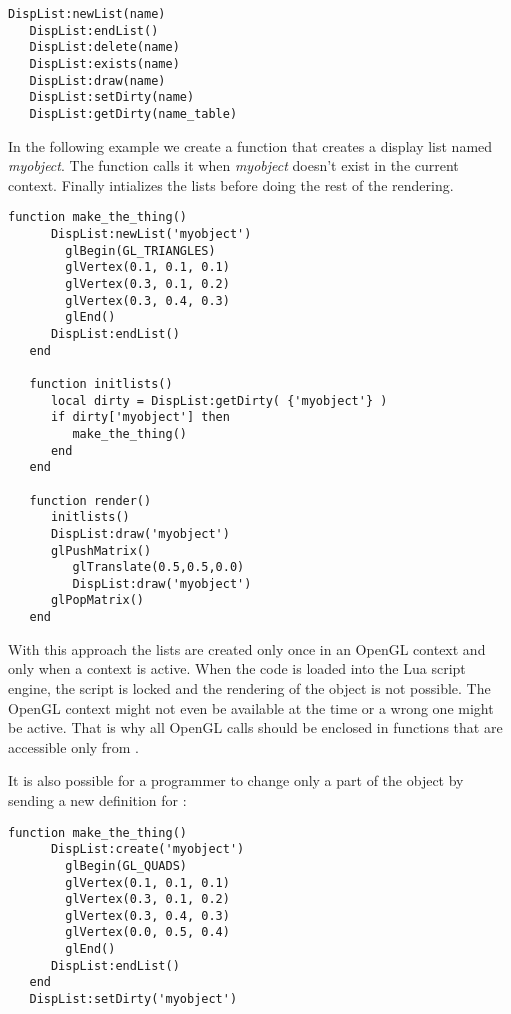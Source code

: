 \begin{Verbatim}[fontsize=\scriptsize,gobble=3]
   DispList:newList(name)
   DispList:endList()
   DispList:delete(name)
   DispList:exists(name)
   DispList:draw(name)
   DispList:setDirty(name)
   DispList:getDirty(name_table)
\end{Verbatim}

In the following example we create a function that creates a display list named
{\em myobject}. The function  calls it when {\em myobject}
doesn't exist in the current context. Finally  intializes the
lists before doing the rest of the rendering.

\begin{Verbatim}[fontsize=\scriptsize,gobble=3]
   function make_the_thing()
      DispList:newList('myobject')
        glBegin(GL_TRIANGLES)
        glVertex(0.1, 0.1, 0.1)
        glVertex(0.3, 0.1, 0.2)
        glVertex(0.3, 0.4, 0.3)
        glEnd()
      DispList:endList()
   end

   function initlists()
      local dirty = DispList:getDirty( {'myobject'} )
      if dirty['myobject'] then
         make_the_thing()
      end
   end

   function render()
      initlists()
      DispList:draw('myobject')
      glPushMatrix()
         glTranslate(0.5,0.5,0.0)
         DispList:draw('myobject')
      glPopMatrix()
   end
\end{Verbatim}

With this approach the lists are created only once in an OpenGL context and
only when a context is active. When the code is loaded into the Lua script
engine, the script is locked and the rendering of the object is not possible.
The OpenGL context might not even be available at the time or a wrong one might
be active. That is why all OpenGL calls should be enclosed in functions that
are accessible only from .

It is also possible for a programmer to change only a part of the object by
sending a new definition for :

\begin{Verbatim}[fontsize=\scriptsize,gobble=3]
   function make_the_thing()
      DispList:create('myobject')
        glBegin(GL_QUADS)
        glVertex(0.1, 0.1, 0.1)
        glVertex(0.3, 0.1, 0.2)
        glVertex(0.3, 0.4, 0.3)
        glVertex(0.0, 0.5, 0.4)
        glEnd()
      DispList:endList()
   end
   DispList:setDirty('myobject')
\end{Verbatim}

